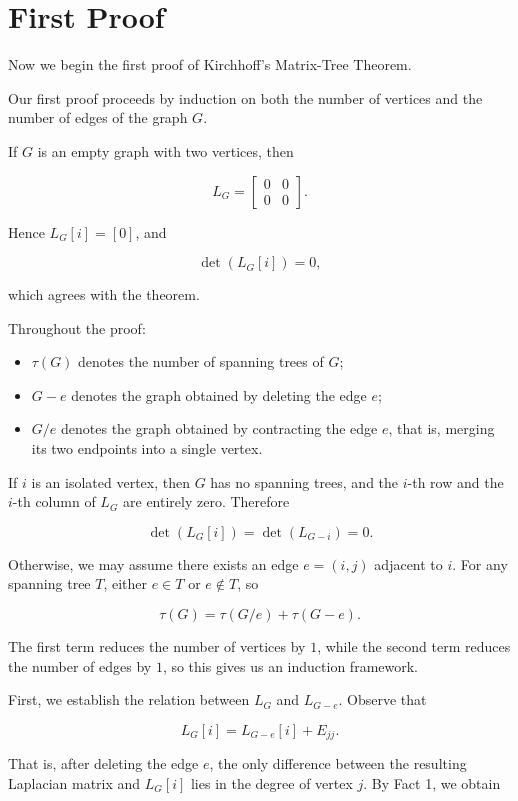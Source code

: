 \documentclass[
  a4paper,
  10pt]{article}
\providecommand{\tightlist}{%
  \setlength{\itemsep}{0pt}\setlength{\parskip}{0pt}}
\begin{document}
\section{First Proof}\label{first-proof}

Now we begin the first proof of Kirchhoff's Matrix-Tree Theorem.

Our first proof proceeds by induction on both the number of vertices and
the number of edges of the graph \(G\).

If \(G\) is an empty graph with two vertices, then

\[
L_G=
\begin{bmatrix}
0 & 0\\
0 & 0
\end{bmatrix}.
\]

Hence \(L_G[i]=[0]\), and

\[
\det(L_G[i])=0,
\]

which agrees with the theorem.

Throughout the proof:

\begin{itemize}
\tightlist
\item
  \(\tau(G)\) denotes the number of spanning trees of \(G\);
\item
  \(G-e\) denotes the graph obtained by deleting the edge \(e\);
\item
  \(G/e\) denotes the graph obtained by contracting the edge \(e\), that
  is, merging its two endpoints into a single vertex.
\end{itemize}

If \(i\) is an isolated vertex, then \(G\) has no spanning trees, and
the \(i\)-th row and the \(i\)-th column of \(L_G\) are entirely zero.
Therefore

\[
\det(L_G[i])=\det(L_{G-i})=0.
\]

Otherwise, we may assume there exists an edge \(e=(i,j)\) adjacent to
\(i\). For any spanning tree \(T\), either \(e \in T\) or
\(e \notin T\), so

\[
\tau(G)=\tau(G/e)+\tau(G-e).
\]

The first term reduces the number of vertices by \(1\), while the second
term reduces the number of edges by \(1\), so this gives us an induction
framework.

First, we establish the relation between \(L_G\) and \(L_{G-e}\).
Observe that

\[
L_G[i]=L_{G-e}[i]+E_{jj}.
\]

That is, after deleting the edge \(e\), the only difference between the
resulting Laplacian matrix and \(L_G[i]\) lies in the degree of vertex
\(j\). By Fact 1, we obtain
\end{document}
